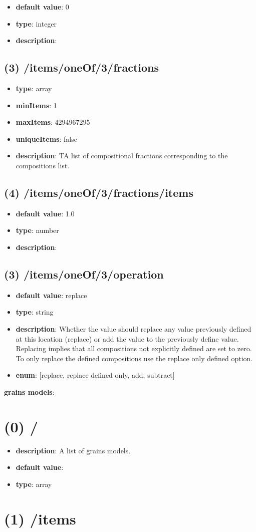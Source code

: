 \begin{itemize}[leftmargin=4em]\item {\bf default value}: 0
\item {\bf type}: integer
\item {\bf description}: 
\end{itemize}\subsection{(3) /items/oneOf/3/fractions}
\begin{itemize}[leftmargin=3em]\item {\bf type}: array
\item {\bf minItems}: 1
\item {\bf maxItems}: 4294967295
\item {\bf uniqueItems}: false
\item {\bf description}: TA list of compositional fractions corresponding to the compositions list.
\end{itemize}\subsection{(4) /items/oneOf/3/fractions/items}
\begin{itemize}[leftmargin=4em]\item {\bf default value}: 1.0
\item {\bf type}: number
\item {\bf description}: 
\end{itemize}\subsection{(3) /items/oneOf/3/operation}
\begin{itemize}[leftmargin=3em]\item {\bf default value}: replace
\item {\bf type}: string
\item {\bf description}: Whether the value should replace any value previously defined at this location (replace) or add the value to the previously define value. Replacing implies that all compositions not explicitly defined are set to zero. To only replace the defined compositions use the replace only defined option.
\item {\bf enum}: [replace, replace defined only, add, subtract]\end{itemize}\item {\bf grains models}: \section{(0) /}
\begin{itemize}[leftmargin=0em]\item {\bf description}: A list of grains models.
\item {\bf default value}: 
\item {\bf type}: array
\end{itemize}\section{(1) /items}


